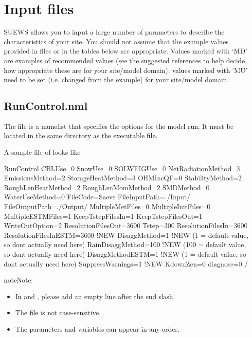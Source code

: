 \documentclass[letterpaper,10pt,english]{sphinxmanual}
\begin{document}
\chapter{Input files}
\label{\detokenize{input_files/input-files::doc}}\label{\detokenize{input_files/input-files:input-files}}
SUEWS allows you to input a large number of parameters to describe the
characteristics of your site. You should not assume that the example
values provided in files or in the tables below are appropriate. Values
marked with ‘MD’ are examples of recommended values (see the suggested
references to help decide how appropriate these are for your site/model
domain); values marked with ‘MU’ need to be set (i.e. changed from the
example) for your site/model domain.


\section{RunControl.nml}
\label{\detokenize{input_files/RunControl/RunControl:runcontrol-nml}}\label{\detokenize{input_files/RunControl/RunControl::doc}}
The file  is a namelist that specifies the options for
the model run. It must be located in the same directory as the
executable file.

A sample file of  looks like

%
\begin{sphinxVerbatim}[commandchars=\\\{\}]
\PYGZam{}RunControl
CBLUse=0
SnowUse=0
SOLWEIGUse=0
NetRadiationMethod=3 
EmissionsMethod=2
StorageHeatMethod=3
OHMIncQF=0
StabilityMethod=2
RoughLenHeatMethod=2
RoughLenMomMethod=2
SMDMethod=0
WaterUseMethod=0
FileCode=\PYGZsq{}Saeve\PYGZsq{}
FileInputPath=\PYGZdq{}./Input/\PYGZdq{}
FileOutputPath=\PYGZdq{}./Output/\PYGZdq{}
MultipleMetFiles=0
MultipleInitFiles=0
MultipleESTMFiles=1
KeepTstepFilesIn=1
KeepTstepFilesOut=1
WriteOutOption=2
ResolutionFilesOut=3600
Tstep=300
ResolutionFilesIn=3600
ResolutionFilesInESTM=3600  !NEW
DisaggMethod=1          !NEW  (1 = default value, so don\PYGZsq{}t actually need here)
RainDisaggMethod=100    !NEW  (100 = default value, so don\PYGZsq{}t actually need here)
DisaggMethodESTM=1      !NEW  (1 = default value, so don\PYGZsq{}t actually need here)
SuppressWarnings=1      !NEW
KdownZen=0
diagnose=0
/
\end{sphinxVerbatim}

\begin{sphinxadmonition}{note}{Note:}\begin{itemize}
\item {} 
In  and , please add an empty line after the end slash.

\item {} 
The file is not case-sensitive.

\item {} 
The parameters and variables can appear in any order.

\end{itemize}
\end{sphinxadmonition}
\end{document}
